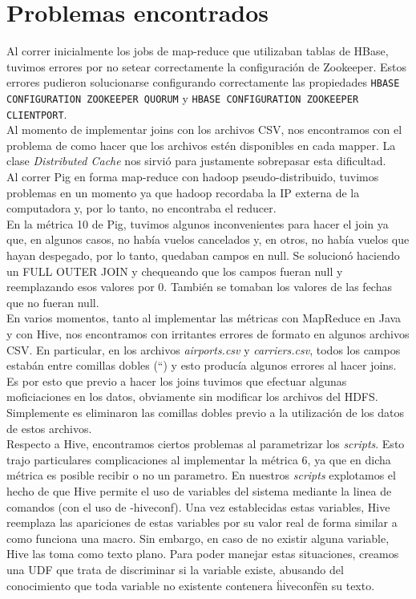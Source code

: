 \documentclass[a4paper,10pt]{article}
\begin{document}
\setcounter{page}{1}

\section{Problemas encontrados}

Al correr inicialmente los jobs de map-reduce que utilizaban tablas de HBase, tuvimos errores por no setear correctamente la configuración de Zookeeper. Estos errores
pudieron solucionarse configurando correctamente las propiedades \texttt{HBASE CONFIGURATION ZOOKEEPER QUORUM} y \texttt{HBASE CONFIGURATION ZOOKEEPER CLIENTPORT}.\\

Al momento de implementar joins con los archivos CSV, nos encontramos con el problema de como hacer que los archivos estén disponibles en cada mapper. La clase
\textit{Distributed Cache} nos sirvió para justamente sobrepasar esta dificultad.\\

Al correr Pig en forma map-reduce con hadoop pseudo-distribuido, tuvimos problemas en un momento ya que hadoop recordaba la IP externa de la computadora y,
por lo tanto, no encontraba el reducer.\\

En la métrica 10 de Pig, tuvimos algunos inconvenientes para hacer el join ya que, en algunos casos, no había vuelos cancelados y, en otros, no había vuelos que hayan despegado, por lo tanto, quedaban campos en null. Se solucionó haciendo un FULL OUTER JOIN y chequeando que los campos fueran null y reemplazando esos valores por 0. También se tomaban los valores de las fechas que no fueran null.\\

En varios momentos, tanto al implementar las métricas con MapReduce en Java y con Hive, nos encontramos con irritantes errores de formato en algunos archivos CSV. En particular,
en los archivos \textit{airports.csv} y \textit{carriers.csv}, todos los campos estabán entre comillas dobles (``) y esto producía algunos errores al hacer joins. Es por esto que
previo a hacer los joins tuvimos que efectuar algunas moficiaciones en los datos, obviamente sin modificar los archivos del HDFS. Simplemente es eliminaron las comillas dobles
previo a la utilización de los datos de estos archivos.\\

Respecto a Hive, encontramos ciertos problemas al parametrizar los \textit{scripts}. Esto trajo particulares complicaciones al implementar la métrica 6, ya que en dicha métrica es posible recibir o no un parametro. En nuestros \textit{scripts} explotamos el hecho de que Hive permite el uso de variables del sistema mediante la linea de comandos (con el uso de -hiveconf). Una vez establecidas estas variables, Hive reemplaza las apariciones de estas variables por su valor real de forma similar a como funciona una macro. Sin embargo, en caso de no existir alguna variable, Hive las toma como texto plano. Para poder manejar estas situaciones, creamos una UDF que trata de discriminar si la variable existe, abusando del conocimiento que toda variable no existente contenera \"hiveconf\" en su texto.
\end{document}
